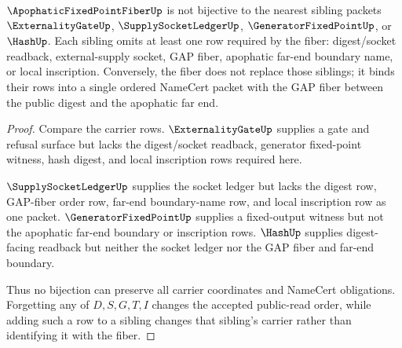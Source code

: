 \begin{theorem}
\label{thm:apophatic-fixed-point-fiber-independence}
$\ApophaticFixedPointFiberUp$ is not bijective to the nearest sibling packets $\ExternalityGateUp$, $\SupplySocketLedgerUp$, $\GeneratorFixedPointUp$, or $\HashUp$. Each sibling omits at least one row required by the fiber: digest/socket readback, external-supply socket, GAP fiber, apophatic far-end boundary name, or local inscription. Conversely, the fiber does not replace those siblings; it binds their rows into a single ordered NameCert packet with the GAP fiber between the public digest and the apophatic far end.
\end{theorem}
\begin{proof}
Compare the carrier rows. $\ExternalityGateUp$ supplies a gate and refusal surface but lacks the digest/socket readback, generator fixed-point witness, hash digest, and local inscription rows required here.

$\SupplySocketLedgerUp$ supplies the socket ledger but lacks the digest row, GAP-fiber order row, far-end boundary-name row, and local inscription row as one packet. $\GeneratorFixedPointUp$ supplies a fixed-output witness but not the apophatic far-end boundary or inscription rows. $\HashUp$ supplies digest-facing readback but neither the socket ledger nor the GAP fiber and far-end boundary.

Thus no bijection can preserve all carrier coordinates and NameCert obligations. Forgetting any of $D,S,G,T,I$ changes the accepted public-read order, while adding such a row to a sibling changes that sibling's carrier rather than identifying it with the fiber.
\end{proof}



